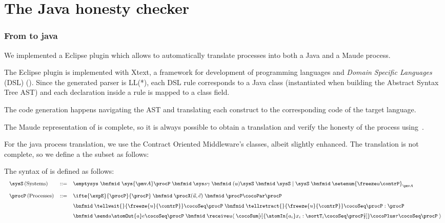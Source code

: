 
\section{The Java honesty checker}\label{sec:java-honesty}



\subsubsection{From \coco to java }
We implemented a \coco Eclipse plugin which allows to automatically
translate \coco processes into both a Java and a Maude process. 

The \coco Eclipse plugin is implemented with Xtext, a framework for
development of programming languages and \textit{Domain Specific
  Languages} (DSL) ().
Since the generated parser is LL(*), each DSL rule corresponds to a
Java class (instantiated when building the Abstract Syntax Tree AST) and
each declaration inside a rule is mapped to a class field.

The code generation happens navigating the AST and translating each
\coco construct to the corresponding code of the target language.

The Maude representation of \coco is complete, so it is always possible to
obtain a translation and verify the honesty of the process using~\cite{BCPZ15jlamp}.

For the java process translation, we use the Contract Oriented
Middleware's classes, albeit slightly enhanced. 
%
The translation is not complete, so we define a the subset \cocosub as follows:

\begin{definition}\label{def:co2sub}
	The syntax of \cocosub is defined as follows:
	\[
	\small
	\begin{array}{r@{\hskip 0.1cm}lclcccccccccccc}   
	& \sysS \, (\text{Systems}) & ::= & 
	\emptysys 
	~\bnfmid ~ \sys {\pmv A} \procP 
	\; \bnfmid \; \sys s \gamma 
	\; \bnfmid \; (u)\sysS
	\; \bnfmid \; \sysS \mid \sysS
	\; \bnfmid \; \setenum{\freeze u \contrP}_{\pmv A}
	\\[.8pc]
	
	& \procP \, (\text{Processes})& ::= &  
	\ifte{\expE}{\procP}{\procP}
	\; \bnfmid \; \procX(\vec u,\vec e)
	\; \bnfmid \; \procP \cocoPar \procP
	\\[.5pc]
	& & &
	\bnfmid \; \tellwait{}{\freeze{u} {\contrP}} \cocoSeq \procP
	\; \bnfmid \; \tellretract{}{\freeze{u} {\contrP}} \cocoSeq \procP : \procP
	\\[.5pc]
	& & &
	\bnfmid \; \send u {\atomOut{a} e} \cocoSeq \procP
	\; \bnfmid \; \receive u \langle\;
    	\cocoSum[i]{{\atomIn{a_i} x_i : \sortT_i} \cocoSeq \procP[\!i]} \cocoPlus \tau \cocoSeq \procP 
    	\;\rangle	
	\end{array}
	\]
\end{definition}

